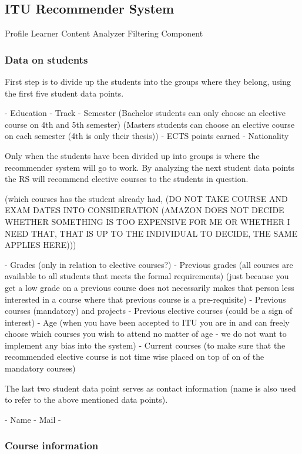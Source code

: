 \subsection{ITU Recommender System}
Profile Learner
Content Analyzer
Filtering Component


\subsubsection{Data on students}
First step is to divide up the students into the groups where they belong, using the first five student data points.

- Education
- Track
- Semester (Bachelor students can only choose an elective course on 4th and 5th semester) (Masters students can choose an elective course on each semester (4th is only their thesis))
- ECTS points earned
- Nationality

Only when the students have been divided up into groups is where the recommender system will go to work. By analyzing the next student data points the RS will recommend elective courses to the students in question.

(which courses has the student already had, (DO NOT TAKE COURSE AND EXAM DATES INTO CONSIDERATION (AMAZON DOES NOT DECIDE WHETHER SOMETHING IS TOO EXPENSIVE FOR ME OR WHETHER I NEED THAT, THAT IS UP TO THE INDIVIDUAL TO DECIDE, THE SAME APPLIES HERE)))

- Grades (only in relation to elective courses?)
- Previous grades (all courses are available to all students that meets the formal requirements) (just because you get a low grade on a previous course does not necessarily makes that person less interested in a course where that previous course is a pre-requisite)
- Previous courses (mandatory) and projects
- Previous elective courses (could be a sign of interest)
- Age (when you have been accepted to ITU you are in and can freely choose which courses you wish to attend no matter of age - we do not want to implement any bias into the system)
- Current courses (to make sure that the recommended elective course is not time wise placed on top of on of the mandatory courses)

The last two student data point serves as contact information (name is also used to refer to the above mentioned data points).
 
- Name
- Mail
- 

\subsubsection{Course information}

